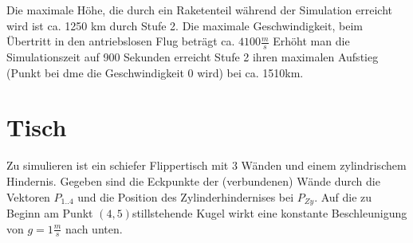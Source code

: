 \documentclass[10pt]{scrartcl}
\begin{document}
	Die maximale Höhe, die durch ein Raketenteil während der Simulation erreicht wird ist ca. 1250 km durch Stufe 2. Die maximale Geschwindigkeit, beim Übertritt in den antriebslosen Flug beträgt ca. $4100 \frac{m}{s}$
	Erhöht man die Simulationszeit auf 900 Sekunden erreicht Stufe 2 ihren maximalen Aufstieg (Punkt bei dme die Geschwindigkeit 0 wird) bei ca. 1510km.
	
	
\section{Tisch}	
Zu simulieren ist ein schiefer Flippertisch mit 3 Wänden und einem zylindrischem Hindernis. Gegeben sind die Eckpunkte der (verbundenen) Wände durch die Vektoren $P_{1..4}$ und die Position des Zylinderhindernises bei $P_{Zy}$. Auf die zu Beginn am Punkt $(4,5)$stillstehende Kugel wirkt eine konstante Beschleunigung von $g=1\frac{m}{s}$ nach unten. 
		
\end{document}
